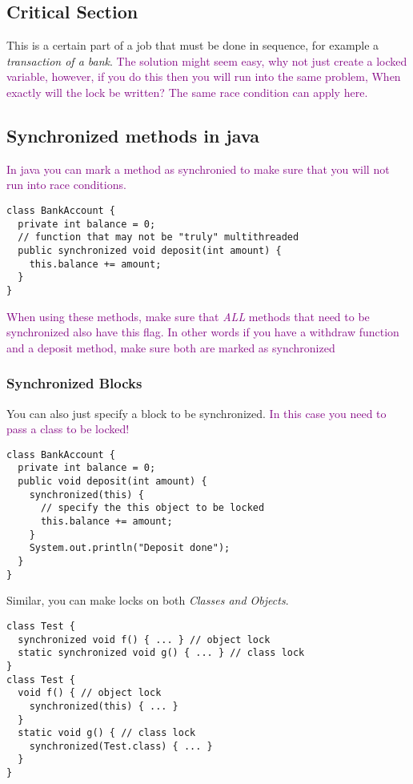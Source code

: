 \documentclass[main.tex,fontsize=8pt,paper=a4,paper=portrait,DIV=calc,]{scrartcl}
\begin{document}
\subsection{Critical Section}
This is a certain part of a job that must be done in sequence, for example a \emph{transaction of a bank}.\newline
\textcolor{purple}{The solution might seem easy, why not just create a locked variable, however, if you do this then you will run into the same problem, When exactly will the lock be written? The same race condition can apply here.} 

\subsection{Synchronized methods in java}
\textcolor{purple}{In java you can mark a method as synchronied to make sure that you will not run into race conditions.}
\begin{lstlisting}
class BankAccount {
  private int balance = 0;
  // function that may not be "truly" multithreaded
  public synchronized void deposit(int amount) {
    this.balance += amount;
  }
}
\end{lstlisting}
\textcolor{purple}{When using these methods, make sure that \emph{ALL} methods that need to be synchronized also have this flag.\newline
In other words if you have a withdraw function and a deposit method, make sure both are marked as synchronized}

\subsubsection{Synchronized Blocks}
You can also just specify a block to be synchronized.\newline
\textcolor{purple}{In this case you need to pass a class to be locked!}
\begin{lstlisting}
class BankAccount {
  private int balance = 0;
  public void deposit(int amount) {
    synchronized(this) {
      // specify the this object to be locked
      this.balance += amount;
    }
    System.out.println("Deposit done");
  }
}
\end{lstlisting}
Similar, you can make locks on both \emph{Classes and Objects}. 
\begin{lstlisting}
class Test {
  synchronized void f() { ... } // object lock
  static synchronized void g() { ... } // class lock
}
class Test {
  void f() { // object lock
    synchronized(this) { ... }
  }
  static void g() { // class lock
    synchronized(Test.class) { ... }
  }
}
\end{lstlisting}
\end{document}
